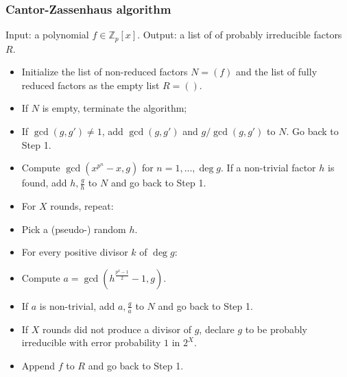 \begin{frame}
\footnotesize
\frametitle{Cantor-Zassenhaus algorithm}
Input: a polynomial $f\in \mathbb Z_p[x]$. Output: a list of of probably irreducible factors $R$.
\begin{itemize}
\item<2->[0] Initialize the list of non-reduced factors  $N=(f)$ and the list of fully reduced factors as the empty list $R=()$. 
\item<3->[1] If $N$ is empty, terminate the algorithm;
\item<5->[2]  If $\gcd(g,g')\neq 1$, add $\gcd(g,g')$ and $g/\gcd(g,g')$ to $N$. Go back to Step 1.
\item<6->[3] Compute $\gcd (x^{p^n}-x, g)$ for $n=1,..., \deg g$. If a non-trivial factor $h$ is found, add $h,\frac{g}{h}$ to $N$ and go back to Step 1.
\item<7->[4] For $X$ rounds, repeat:
\item<8->[4.1] Pick a (pseudo-) random $h$.
\item<9->[4.2] For every positive divisor $k$ of $\deg g$:
\item<10->[4.2.1] Compute $a=\gcd \left(h^{\frac{p^k-1}{2}}-1,g \right)$.
\item<11->[4.2.2] If $a$ is non-trivial, add $a,\frac{g}{a}$ to $N$ and go back to Step 1.
\item<12->[5] If $X$ rounds did not produce a divisor of $g$, declare $g$ to be probably irreducible with error probability $1$ in $2^X$. 
\item<13->[6] Append $f$ to $R$ and go back to Step 1.
\end{itemize}
\end{frame}